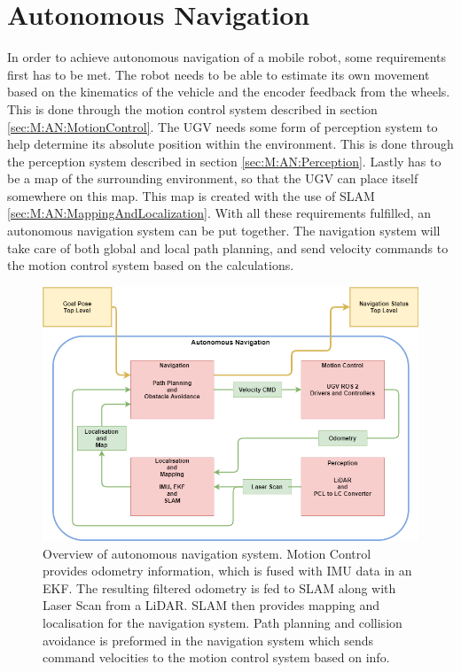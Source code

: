\section{Autonomous Navigation}
In order to achieve autonomous navigation of a mobile robot, some requirements first has to be met. The robot needs to be able to estimate its own movement based on the kinematics of the vehicle and the encoder feedback from the wheels. This is done through the motion control system described in section \ref{sec:M:AN:MotionControl}. The UGV needs some form of perception system to help determine its absolute position within the environment. This is done through the perception system described in section \ref{sec:M:AN:Perception}. Lastly has to be a map of the surrounding environment, so that the UGV can place itself somewhere on this map. This map is created with the use of SLAM \ref{sec:M:AN:MappingAndLocalization}. With all these requirements fulfilled, an autonomous navigation system can be put together. The navigation system will take care of both global and local path planning, and send velocity commands to the motion control system based on the calculations.

\begin{figure}[H]
  \centering
  \includegraphics[width = 1\textwidth]{Figures/figANMethod.drawio.png}
  \caption{Overview of autonomous navigation system. Motion Control provides odometry information, which is fused with IMU data in an EKF. The resulting filtered odometry is fed to SLAM along with Laser Scan from a LiDAR. SLAM then provides mapping and localisation for the navigation system. Path planning and collision avoidance is preformed in the navigation system which sends command velocities to the motion control system based on info.}
  \label{fig:M:AN:ANMethod}
\end{figure}

